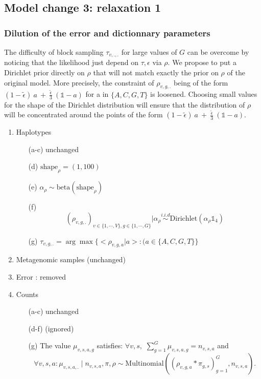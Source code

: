 \documentclass{article}
\begin{document}
\subsection{Model change 3: relaxation 1}
\subsubsection{Dilution of the error and dictionnary parameters}

The difficulty of block sampling $\tau_{v,.,.}$ for large values of $G$ can be overcome by noticing that the likelihood just depend on $\tau,\epsilon$ via
$\rho$. We propose to put a Dirichlet prior directly on $\rho$ that will not match exactly the prior on $\rho$ of the original model. More precisely, the constraint of $\rho_{v,g,.}$ being of the form $(1-\tilde\epsilon)~a~+~ \frac{\tilde\epsilon}3~(\mathds{1}-a)$ for a in $\{A,C,G,T\}$ is loosened. Choosing small values for the shape of the Dirichlet distribution will ensure that the distribution of $\rho$ will be concentrated around the points of the form $(1-\tilde\epsilon)~a~+~ \frac{\tilde\epsilon}3~(\mathds{1}-a)$.
\begin{enumerate}[1.]
    \item Haplotypes
    \begin{enumerate}
    \item[(a-c)] unchanged
    \item[(d)] $\mathrm{shape}_{\rho}=(1,100)$
    \item[(e)] $\alpha_{\rho}\sim\mathrm{beta}\left(\mathrm{shape}_{\rho}\right)$
    \item[(f)] $$\left(\rho_{v,g,.}\right)_{v\in\{1,\cdots,V\},g\in\{1,\cdots,G\}}|\alpha_{\rho}\overset{i.i.d }{\sim}\mathrm{Dirichlet}(\alpha_{\rho}\mathds{1}_4)$$
    \item[(g)] 
    $\tau_{v,g,.}=\arg\max\{ <\rho_{v,g,a}|a>:(a\in\{A,C,G,T\}\}$

    \end{enumerate}
    \item Metagenomic samples (unchanged)
    \item Error : removed
    \item Counts
    \begin{enumerate}

\item[(a-c)] unchanged
    \item [(d-f)] (ignored)
     \item[(g)] The value $\mu_{v,s,a,g}$ satisfies: $\forall v,s,$  $\sum_{g=1}^G\mu_{v,s,a,g}=n_{v,s,a}$ and
    $$\forall v,s,a : \mu_{v,s,a,.} \mid n_{v,s,a},\pi, \rho \sim \mathrm{Multinomial}\left(\left(\rho_{v,g,a}*\pi_{g,s}\right)_{g=1}^G,n_{v,s,a}\right).$$
    

\end{enumerate}
\end{enumerate}
\end{document}
